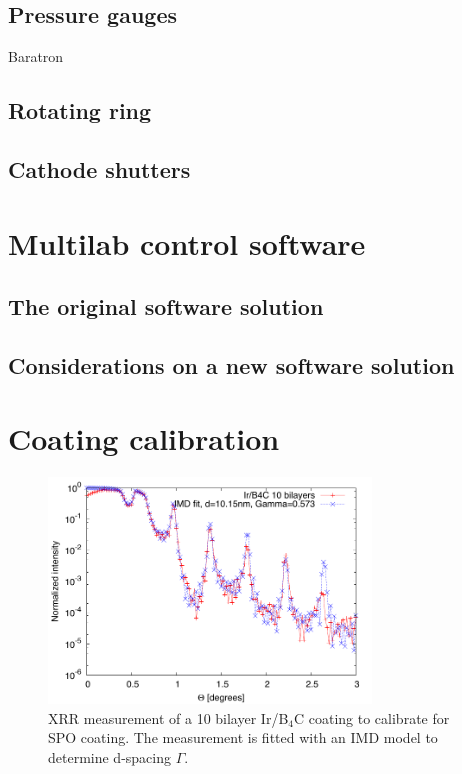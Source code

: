 \subsection{Pressure gauges}
Baratron\\

\subsection{Rotating ring}

\subsection{Cathode shutters}

\section{Multilab control software}\label{sec:ml_software}
\subsection{The original software solution}
\subsection{Considerations on a new software solution}

\section{Coating calibration}

\begin{figure}[!h]
	\center
	\includegraphics[height=6cm]{figures/chamber/si5811-fit.pdf}
\caption{\footnotesize XRR measurement of a 10 bilayer Ir/B$_4$C coating to calibrate for SPO coating. The measurement is fitted with an IMD model to determine d-spacing $\Gamma$.}\label{fig:irb4c-fit}
\end{figure}


